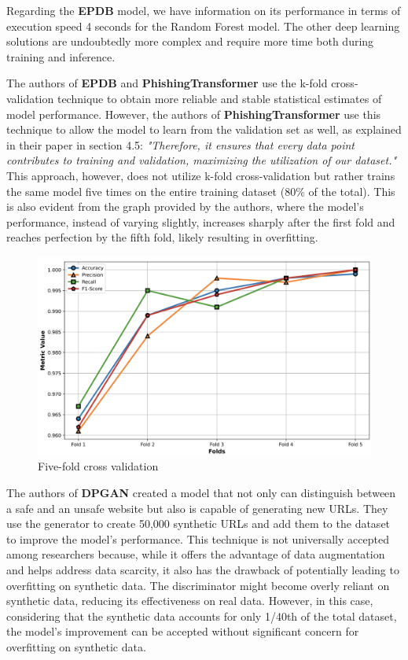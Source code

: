 Regarding the \textbf{EPDB} model, we have information on its performance in terms of execution speed 4 seconds for the Random Forest model. The other deep learning solutions are undoubtedly more complex and require more time both during training and inference.

The authors of \textbf{EPDB} and \textbf{PhishingTransformer} use the k-fold cross-validation technique to obtain more reliable and stable statistical estimates of model performance. However, the authors of \textbf{PhishingTransformer} use this technique to allow the model to learn from the validation set as well, as explained in their paper in section 4.5: \textit{"Therefore, it ensures that every data point contributes to training and validation, maximizing the utilization of our dataset."} This approach, however, does not utilize k-fold cross-validation but rather trains the same model five times on the entire training dataset (80\% of the total). This is also evident from the graph provided by the authors, where the model's performance, instead of varying slightly, increases sharply after the first fold and reaches perfection by the fifth fold, likely resulting in overfitting.

\begin{figure}[htp]
    \centering
    \includegraphics[width=0.8\linewidth]{images/K-fold errror.png}
    \caption{Five-fold cross validation}
    \label{fig:Five-fold cross validation}
\end{figure}
The authors of \textbf{DPGAN} created a model that not only can distinguish between a safe and an unsafe website but also is capable of generating new URLs. They use the generator to create 50,000 synthetic URLs and add them to the dataset to improve the model's performance. This technique is not universally accepted among researchers because, while it offers the advantage of data augmentation and helps address data scarcity, it also has the drawback of potentially leading to overfitting on synthetic data. The discriminator might become overly reliant on synthetic data, reducing its effectiveness on real data. However, in this case, considering that the synthetic data accounts for only 1/40th of the total dataset, the model's improvement can be accepted without significant concern for overfitting on synthetic data.

